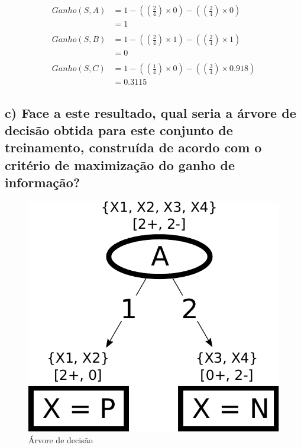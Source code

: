 \documentclass[
    article,            %
    11pt,               %
    oneside,            %
    a4paper,            %
    english,            %
    brazil,             %
    sumario=tradicional,
    ]{abntex2}
\begin{document}
\begin{align*}
Ganho(S, A) &= 1 - ((\tfrac{2}{4}) \times 0) - ((\tfrac{2}{4}) \times 0)      \\ 
            &= 1                                                            \\\\
Ganho(S, B) &= 1 - ((\tfrac{2}{4}) \times 1) - ((\tfrac{2}{4}) \times 1)      \\ 
            &= 0                                                            \\\\
Ganho(S, C) &= 1 - ((\tfrac{1}{4}) \times 0) - ((\tfrac{3}{4}) \times 0.918)  \\ 
            &= 0.3115
\end{align*}

\subsection*{\textbf{c) Face a este resultado, qual seria a árvore de decisão obtida para este conjunto de treinamento, construída de acordo com o critério de maximização do ganho de informação?}}

\begin{figure}[H]
    \label{decision_tree_fig}
    \caption{Árvore de decisão}
    \begin{center}
        \includegraphics[scale=0.5]{imgs/decision-tree.pdf}
    \end{center}
\end{figure}
\end{document}
